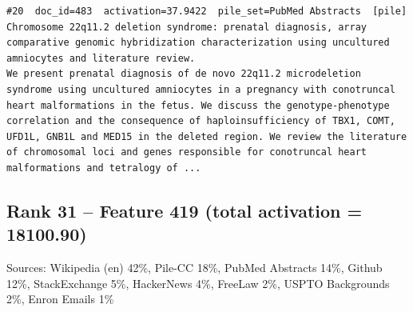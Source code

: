 \begin{verbatim}
#20  doc_id=483  activation=37.9422  pile_set=PubMed Abstracts  [pile]
Chromosome 22q11.2 deletion syndrome: prenatal diagnosis, array comparative genomic hybridization characterization using uncultured amniocytes and literature review.
We present prenatal diagnosis of de novo 22q11.2 microdeletion syndrome using uncultured amniocytes in a pregnancy with conotruncal heart malformations in the fetus. We discuss the genotype-phenotype correlation and the consequence of haploinsufficiency of TBX1, COMT, UFD1L, GNB1L and MED15 in the deleted region. We review the literature of chromosomal loci and genes responsible for conotruncal heart malformations and tetralogy of ...

\end{verbatim}

\subsection*{Rank 31 -- Feature 419 (total activation = 18100.90)}

Sources: Wikipedia (en) 42\%, Pile-CC 18\%, PubMed Abstracts 14\%, Github 12\%, StackExchange 5\%, HackerNews 4\%, FreeLaw 2\%, USPTO Backgrounds 2\%, Enron Emails 1\%

